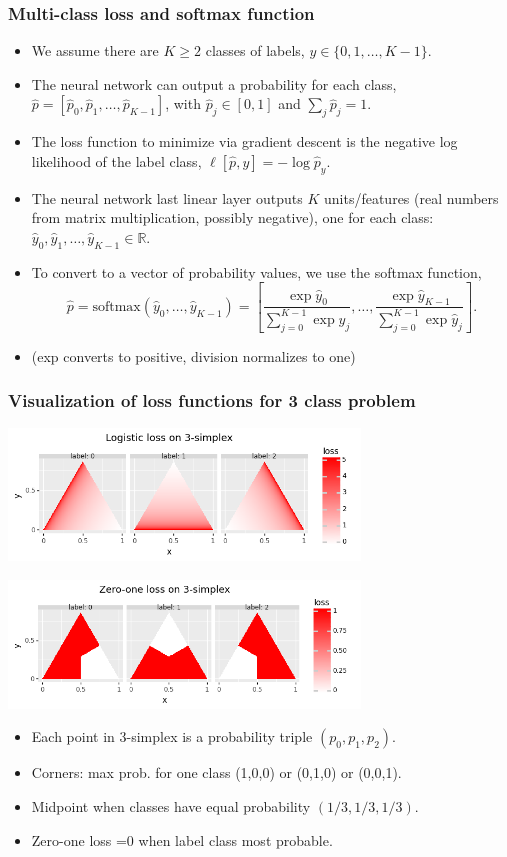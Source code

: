 \message{ !name(06-backprop.tex)}\documentclass{beamer}
\begin{document}
\begin{frame}
  \frametitle{Multi-class loss and softmax function}

  \begin{itemize}
  \item We assume there are $K\geq 2$ classes of labels,
    $y\in\{0,1, \dots, K-1\}$.
  \item The neural network can output a probability for each
    class, $\hat p = [\hat p_0,\hat p_1,\dots,\hat p_{K-1}]$, with
    $\hat p_j\in[0,1]$ and $\sum_j \hat p_j=1$.
  \item The loss function to minimize via gradient descent is the
    negative log likelihood of the label class, $\ell[\hat p,y] = -\log \hat p_y.$
  \item The neural network last linear layer outputs $K$
    units/features (real numbers from matrix multiplication, possibly
    negative), one for each class:
    $\hat y_0,\hat y_1,\dots, \hat y_{K-1}\in\mathbb R$.
  \item To convert to a vector of probability values, we use the
    softmax function, 
$$ \hat p=\text{softmax}(\hat y_0, \dots, \hat y_{K-1}) = 
\left[ \frac{\exp\hat y_0}{\sum_{j=0}^{K-1} \exp\hat y_j}, \dots,
\frac{\exp\hat y_{K-1}}{\sum_{j=0}^{K-1} \exp\hat y_j}\right].
$$
\item (exp converts to positive, division normalizes to one)
  \end{itemize}
\end{frame}

\begin{frame}
  \frametitle{Visualization of loss functions for 3 class problem}
  
  \includegraphics[width=0.7\textwidth]{2022-02-15-simplex-multi-logistic}

  \includegraphics[width=0.7\textwidth]{2022-02-15-simplex-multi-zero-one}

  \begin{itemize}
  \item Each point in 3-simplex is a probability triple
    $(p_0,p_1,p_2)$.
  \item Corners: max prob. for one class (1,0,0)
    or (0,1,0) or (0,0,1).
  \item Midpoint when classes have equal probability
    $(1/3, 1/3, 1/3)$.
  \item Zero-one loss =0 when label class most probable.
  \end{itemize}
\end{frame}
\end{document}
